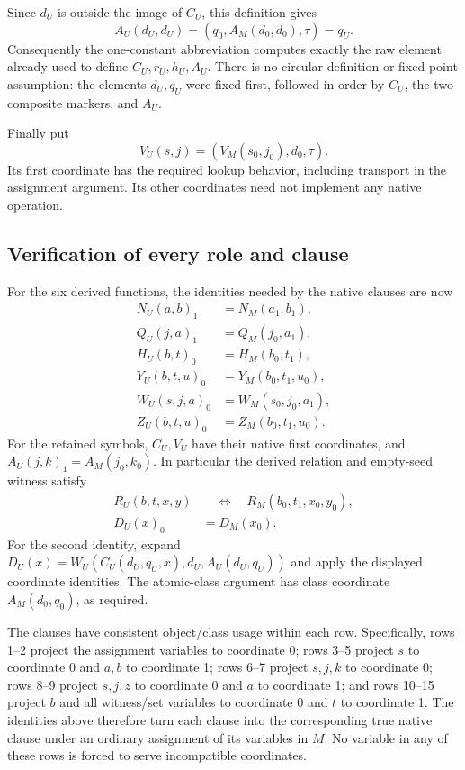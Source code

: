 Since $d_U$ is outside the image of $C_U$, this definition gives
\[
 A_U(d_U,d_U)
   =(q_0,A_M(d_0,d_0),\tau)=q_U.
\]
Consequently the one-constant abbreviation computes exactly the raw
element already used to define $C_U,r_U,h_U,A_U$.  There is no circular
definition or fixed-point assumption: the elements $d_U,q_U$ were fixed
first, followed in order by $C_U$, the two composite markers, and $A_U$.

Finally put
\[
 V_U(s,j)=(V_M(s_0,j_0),d_0,\tau).
\]
Its first coordinate has the required lookup behavior, including
transport in the assignment argument.  Its other coordinates need not
implement any native operation.

\subsection{Verification of every role and clause}

For the six derived functions, the identities needed by the native
clauses are now
\begin{align*}
 N_U(a,b)_1&=N_M(a_1,b_1),\\
 Q_U(j,a)_1&=Q_M(j_0,a_1),\\
 H_U(b,t)_0&=H_M(b_0,t_1),\\
 Y_U(b,t,u)_0&=Y_M(b_0,t_1,u_0),\\
 W_U(s,j,a)_0&=W_M(s_0,j_0,a_1),\\
 Z_U(b,t,u)_0&=Z_M(b_0,t_1,u_0).
\end{align*}
For the retained symbols, $C_U,V_U$ have their native first coordinates,
and $A_U(j,k)_1=A_M(j_0,k_0)$.  In particular the derived relation
and empty-seed witness satisfy
\begin{align*}
 R_U(b,t,x,y)&\quad\Longleftrightarrow\quad
 R_M(b_0,t_1,x_0,y_0),\\
 D_U(x)_0&=D_M(x_0).
\end{align*}
For the second identity, expand
$D_U(x)=W_U(C_U(d_U,q_U,x),d_U,A_U(d_U,q_U))$ and apply the displayed
coordinate identities.  The atomic-class argument has class coordinate
$A_M(d_0,q_0)$, as required.

The clauses have consistent object/class usage within each row.
Specifically, rows 1--2 project the assignment variables to coordinate
0; rows 3--5 project $s$ to coordinate 0 and $a,b$ to coordinate 1;
rows 6--7 project $s,j,k$ to coordinate 0; rows 8--9 project $s,j,z$ to
coordinate 0 and $a$ to coordinate 1; and rows 10--15 project $b$ and
all witness/set variables to coordinate 0 and $t$ to coordinate 1.
The identities above therefore turn each clause into the corresponding
true native clause under an ordinary assignment of its variables in
$M$.  No variable in any of these rows is forced to serve incompatible
coordinates.


